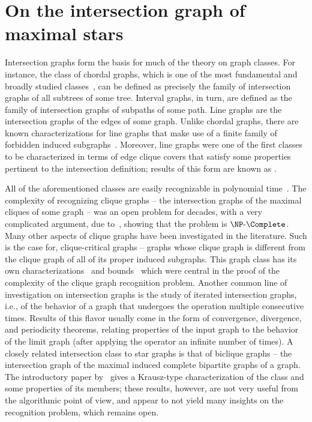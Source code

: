 \chapter{On the intersection graph of maximal stars}
\label{ch:star_graph}


Intersection graphs form the basis for much of the theory on graph classes.
For instance, the class of chordal graphs, which is one of the most fundamental and broadly studied classes~\cite{classes_survey}, can be defined as precisely the family of intersection graphs of all subtrees of some tree.
Interval graphs, in turn, are defined as the family of intersection graphs of subpaths of some path.
Line graphs are the intersection graphs of the edges of some graph.
Unlike chordal graphs, there are known characterizations for line graphs that make use of a finite family of forbidden induced subgraphs~\citep{line_nich}.
Moreover, line graphs were one of the first classes to be characterized in terms of edge clique covers that satisfy some properties pertinent to the intersection definition; results of this form are known as .

All of the aforementioned classes are easily recognizable in polynomial time~\cite{classes_survey,line_naor}.
The complexity of recognizing clique graphs -- the intersection graphs of the maximal cliques of some graph -- was an open problem for decades, with a very complicated argument, due to~\cite{clique_recognition}, showing that the problem is $\NPc$.
Many other aspects of clique graphs have been investigated in the literature.
Such is the case for, clique-critical graphs -- graphs whose clique graph is different from the clique graph of all of its proper induced subgraphs.
This graph class has its own characterizations~\cite{clique_critical_toft} and bounds~\cite{clique_critical_alcon} which were central in the proof of the complexity of the clique graph recognition problem.
Another common line of investigation on intersection graphs is the study of iterated intersection graphs, i.e., of the behavior of a graph that undergoes the operation multiple consecutive times.
Results of this flavor usually come in the form of convergence, divergence, and periodicity theorems, relating properties of the input graph to the behavior of the limit graph (after applying the operator an infinite number of times).
A closely related intersection class to star graphs is that of biclique graphs -- the intersection graph of the maximal induced complete bipartite graphs of a graph.
The introductory paper by~\cite{biclique_graph} gives a Krausz-type characterization of the class and some properties of its members; these results, however, are not very useful from the algorithmic point of view, and appear to not yield many insights on the recognition problem, which remains open.

